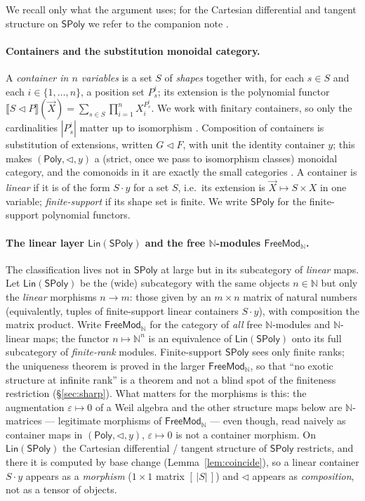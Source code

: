 \documentclass[11pt]{article}
\theoremstyle{definition}
\newcommand{\SPoly}{\mathsf{SPoly}}
\newcommand{\Lin}{\mathsf{Lin}}
\newcommand{\FreeMod}{\mathsf{FreeMod}}
\newcommand{\Poly}{\mathsf{Poly}}
\newcommand{\N}{\mathbb{N}}
\newcommand{\sem}[1]{\llbracket #1 \rrbracket}
\begin{document}
We recall only what the argument uses; for the Cartesian differential and tangent structure on
$\SPoly$ we refer to the companion note \cite{MacBethTangent}.

\paragraph{Containers and the substitution monoidal category.}
A \emph{container in $n$ variables} is a set $S$ of \emph{shapes} together with, for each $s\in S$
and each $i\in\{1,\dots,n\}$, a position set $P^i_s$; its extension is the polynomial functor
$\sem{S\lhd P}(\vec X)=\sum_{s\in S}\prod_{i=1}^n X_i^{P^i_s}$. We work with finitary containers, so
only the cardinalities $|P^i_s|$ matter up to isomorphism \cite{AAGM2003}. Composition of containers
is substitution of extensions, written $G\lhd F$, with unit the identity container $y$; this makes
$(\Poly,\lhd,y)$ a (strict, once we pass to isomorphism classes) monoidal category, and the
comonoids in it are exactly the small categories \cite{AhmanUustalu2016,GambinoKock2013}. A container
is \emph{linear} if it is of the form $S\cdot y$ for a set $S$, i.e.\ its extension is
$\vec X\mapsto S\times X$ in one variable; \emph{finite-support} if its shape set is finite. We
write $\SPoly$ for the finite-support polynomial functors.

\paragraph{The linear layer $\Lin(\SPoly)$ and the free $\N$-modules $\FreeMod_\N$.}
The classification lives not in $\SPoly$ at large but in its subcategory of \emph{linear} maps. Let
$\Lin(\SPoly)$ be the (wide) subcategory with the same objects $n\in\N$ but only the \emph{linear}
morphisms $n\to m$: those given by an $m\times n$ matrix of natural numbers (equivalently, tuples of
finite-support linear containers $S\cdot y$), with composition the matrix product. Write
$\FreeMod_\N$ for the category of \emph{all} free $\N$-modules and $\N$-linear maps; the functor
$n\mapsto\N^n$ is an equivalence of $\Lin(\SPoly)$ onto its full subcategory of \emph{finite-rank}
modules. Finite-support $\SPoly$ sees only finite ranks; the uniqueness theorem is proved in the
larger $\FreeMod_\N$, so that ``no exotic structure at infinite rank'' is a theorem and not a blind
spot of the finiteness restriction (\S\ref{sec:sharp}). What matters for the morphisms is this: the
augmentation $\varepsilon\mapsto0$ of a Weil algebra and the other structure maps below are
$\N$-matrices --- legitimate morphisms of $\FreeMod_\N$ --- even though, read naively as container
maps in $(\Poly,\lhd,y)$, $\varepsilon\mapsto0$ is not a container morphism. On $\Lin(\SPoly)$ the
Cartesian differential / tangent structure of $\SPoly$ \cite{MacBethTangent} restricts, and there it
is computed by base change (Lemma~\ref{lem:coincide}), so a linear container $S\cdot y$ appears as a
\emph{morphism} ($1\times1$ matrix $[\,|S|\,]$) and $\lhd$ appears as \emph{composition}, not as a
tensor of objects.
\end{document}
